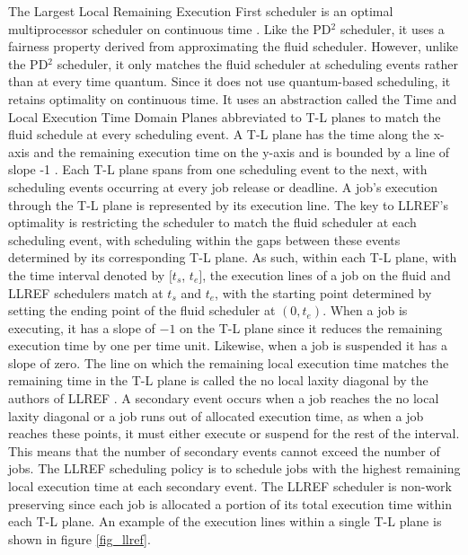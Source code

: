 \documentclass[conference,compsoc]{IEEEtran}
\begin{document}
The Largest Local Remaining Execution First scheduler is an optimal multiprocessor scheduler on continuous time \cite{llref}. Like the PD$^2$ scheduler, it uses a fairness property derived from approximating the fluid scheduler. However, unlike the PD$^2$ scheduler, it only matches the fluid scheduler at scheduling events rather than at every time quantum. Since it does not use quantum-based scheduling, it retains optimality on continuous time. It uses an abstraction called the Time and Local Execution Time Domain Planes abbreviated to T-L planes to match the fluid schedule at every scheduling event. A T-L plane has the time along the x-axis and the remaining execution time on the y-axis and is bounded by a line of slope -1 \cite{llref}. Each T-L plane spans from one scheduling event to the next, with scheduling events occurring at every job release or deadline. A job's execution through the T-L plane is represented by its execution line. The key to LLREF’s optimality is restricting the scheduler to match the fluid scheduler at each scheduling event, with scheduling within the gaps between these events determined by its corresponding T-L plane. As such, within each T-L plane, with the time interval denoted by $[t_s$, $t_e]$, the execution lines of a job on the fluid and LLREF schedulers match at $t_s$ and $t_e$, with the starting point determined by setting the ending point of the fluid scheduler at $(0, t_e)$. When a job is executing, it has a slope of $-1$ on the T-L plane since it reduces the remaining execution time by one per time unit. Likewise, when a job is suspended it has a slope of zero. The line on which the remaining local execution time matches the remaining time in the T-L plane is called the no local laxity diagonal by the authors of LLREF \cite{llref}. A secondary event occurs when a job reaches the no local laxity diagonal or a job runs out of allocated execution time, as when a job reaches these points, it must either execute or suspend for the rest of the interval. This means that the number of secondary events cannot exceed the number of jobs. The LLREF scheduling policy is to schedule jobs with the highest remaining local execution time at each secondary event. The LLREF scheduler is non-work preserving since each job is allocated a portion of its total execution time within each T-L plane. An example of the execution lines within a single T-L plane is shown in figure \ref{fig_llref}.
\end{document}
